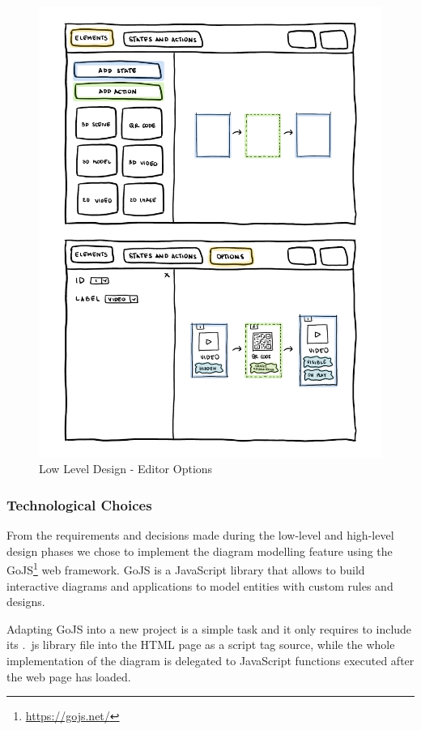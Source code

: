 \begin{figure}[h]
    \centering
    \includegraphics[width=\textwidth]{Figures/Editor/wireframes/canva2.png}
    \caption{Low Level Design - Editor Options}
    \label{fig:canva2}
\end{figure}

\subsubsection*{Technological Choices}
\label{subsub:art-editor-technological}
From the requirements and decisions made during the low-level and high-level design phases we chose to implement the diagram modelling feature using the GoJS\footnote{\url{https://gojs.net/}} web framework. GoJS is a JavaScript library that allows to build interactive diagrams and applications to model entities with custom rules and designs.

Adapting GoJS into a new project is a simple task and it only requires to include its .~js library file into the HTML page as a script tag source, while the whole implementation of the diagram is delegated to JavaScript functions executed after the web page has loaded.

